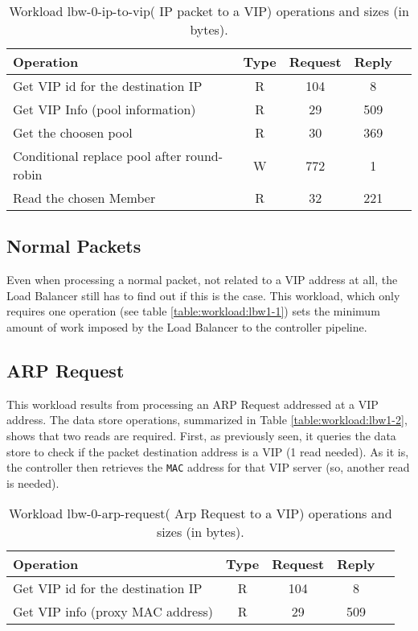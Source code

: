 \documentclass[12pt,openright,twoside]{report}
\begin{document}


\begin{table}[H]
\centering 
\begin{tabular}{l c c c c}
 Operation & Type & Request & Reply \\ \toprule 
 
Get VIP id for the destination IP & R & 104 & 8\\\midrule
Get VIP Info (pool information) & R & 29 & 509\\\midrule
Get the choosen pool & R & 30 & 369\\\midrule
Conditional replace pool after round-robin & W & 772 & 1\\\midrule
Read the chosen Member & R & 32 & 221 \\\bottomrule
\end{tabular}\caption[Workload lbw-0-ip-to-vip( IP packet to a VIP)
operations]{Workload lbw-0-ip-to-vip( IP packet to a VIP) operations
  and sizes (in bytes).}\end{table}

\subsection{Normal Packets}
Even when processing a normal packet, not related to a VIP address at
all, the Load Balancer still has to find out if this is the case. This workload, which only requires one operation (see
table \ref{table:workload:lbw1-1}) sets the minimum amount of work imposed by
the Load Balancer to the controller pipeline. 

\subsection{ARP Request}
This workload  results  from processing an ARP Request addressed at a
VIP address. The data store operations, summarized in Table
\ref{table:workload:lbw1-2}, shows that two reads are
required. First, as previously seen,  it queries the data
store to check if the packet destination address is a VIP (1 read
needed). As it is, the controller then retrieves the \texttt{MAC} address for that
VIP server (so, another read is needed).

\begin{table}[ht]
\small
\centering 
\begin{tabular}{l c c c c}
Operation & Type & Request & Reply \\ \toprule 
Get VIP id for the destination IP  & R & 104 & 8\\\midrule
Get VIP info (proxy MAC address) & R & 29 & 509 \\\bottomrule
\end{tabular}\caption[Workload lbw-0-arp-request( Arp Request to a
VIP) operations]{Workload lbw-0-arp-request( Arp Request to a VIP)
 operations and sizes (in bytes).}
\end{table}
\end{document}
